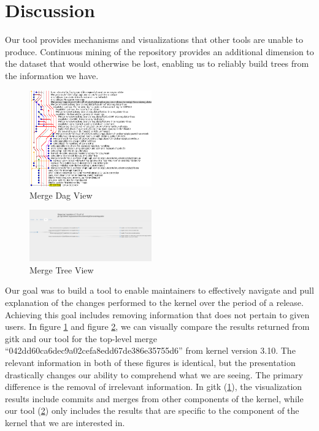 \documentclass[conference, draftclsnofoot]{IEEEtran}
\begin{document}
\section{Discussion}

Our tool provides mechanisms and visualizations that other tools are unable to
produce. Continuous mining of the repository\cite{German} provides an
additional dimension to the dataset that would otherwise be lost, enabling us
to reliably build trees from the information we have.

\begin{figure}[h]
	\centering
	\includegraphics[width=0.47\textwidth]{figures/042dd_DAG.png}
	\caption{Merge Dag View}
	\label{fig:dag_view}
\end{figure}

\begin{figure}[h]
	\centering
	\includegraphics[width=0.47\textwidth]{figures/042dd_tree.png}
	\caption{Merge Tree View}
	\label{fig:tree_view}
\end{figure}

Our goal was to build a tool to enable maintainers to effectively navigate and
pull explanation of the changes performed to the kernel over the period of a
release.  Achieving this goal includes removing information that does not
pertain to given users. In figure \ref{fig:dag_view} and figure
\ref{fig:tree_view}, we can visually compare the results returned from gitk and
our tool for the top-level merge ``042dd60ca6dec9a02cefa8edd67de386e35755d6''
from kernel version 3.10. The relevant information in both of these figures is
identical, but the presentation drastically changes our ability to comprehend
what we are seeing. The primary difference is the removal of irrelevant
information. In gitk (\ref{fig:dag_view}), the visualization results include
commits and merges from other components of the kernel, while our tool
(\ref{fig:tree_view}) only includes the results that are specific to the
component of the kernel that we are interested in.
\end{document}

